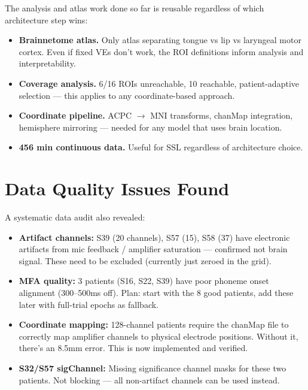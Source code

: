 \documentclass[11pt]{article}
\begin{document}
The analysis and atlas work done so far is reusable regardless of which architecture step wins:

\begin{itemize}[nosep]
    \item \textbf{Brainnetome atlas.} Only atlas separating tongue vs lip vs laryngeal motor cortex. Even if fixed VEs don't work, the ROI definitions inform analysis and interpretability.
    \item \textbf{Coverage analysis.} 6/16 ROIs unreachable, 10 reachable, patient-adaptive selection --- this applies to any coordinate-based approach.
    \item \textbf{Coordinate pipeline.} ACPC $\to$ MNI transforms, chanMap integration, hemisphere mirroring --- needed for any model that uses brain location.
    \item \textbf{456 min continuous data.} Useful for SSL regardless of architecture choice.
\end{itemize}

\section{Data Quality Issues Found}

A systematic data audit also revealed:

\begin{itemize}[nosep]
    \item \textbf{Artifact channels:} S39 (20 channels), S57 (15), S58 (37) have electronic artifacts from mic feedback / amplifier saturation --- confirmed not brain signal. These need to be excluded (currently just zeroed in the grid).
    \item \textbf{MFA quality:} 3 patients (S16, S22, S39) have poor phoneme onset alignment (300--500ms off). Plan: start with the 8 good patients, add these later with full-trial epochs as fallback.
    \item \textbf{Coordinate mapping:} 128-channel patients require the chanMap file to correctly map amplifier channels to physical electrode positions. Without it, there's an 8.5mm error. This is now implemented and verified.
    \item \textbf{S32/S57 sigChannel:} Missing significance channel masks for these two patients. Not blocking --- all non-artifact channels can be used instead.
\end{itemize}
\end{document}
